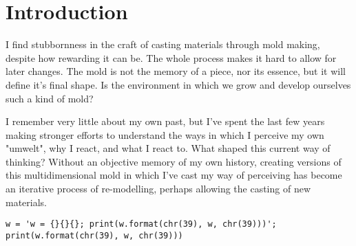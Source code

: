 
\chapter*{Introduction}



I find stubbornness in the craft of casting materials through mold making, despite how rewarding it can be. The whole process makes it hard to allow for later changes. The mold is not the memory of a piece, nor its essence, but it will define it's final shape. Is the environment in which we grow and develop ourselves such a kind of mold? 

I remember very little about my own past, but I’ve spent the last few years making stronger efforts to understand the ways in which I perceive my own "umwelt", why I react, and what I react to. What shaped this current way of thinking? Without an objective memory of my own history, creating versions of this multidimensional mold in which I’ve cast my way of perceiving has become an iterative process of re-modelling, perhaps allowing the casting of new materials.


\begin{center}
\footnotesize
\begin{verbatim}
w = 'w = {}{}{}; print(w.format(chr(39), w, chr(39)))'; print(w.format(chr(39), w, chr(39)))
\end{verbatim}
\normalsize
\end{center}




